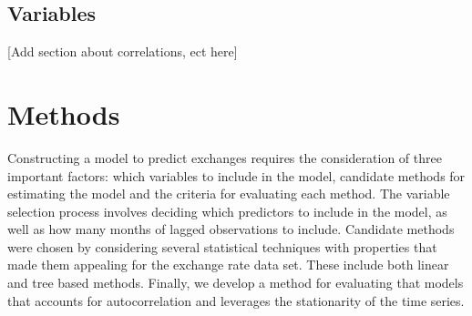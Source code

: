 \documentclass{sig-alternate-05-2015}
\begin{document}

\subsection{Variables}

[Add section about correlations, ect here]

\section{Methods}
Constructing a model to predict exchanges requires the consideration of three important factors: which variables to include in the model, candidate methods for estimating the model and the criteria for evaluating each method. The variable selection process involves deciding which predictors to include in the model, as well as how many months of lagged observations to include. Candidate methods were chosen by considering several statistical techniques with properties that made them appealing for the exchange rate data set. These include both linear and tree based methods. Finally, we develop a method for evaluating that models that accounts for autocorrelation and leverages the stationarity of the time series.
\end{document}
